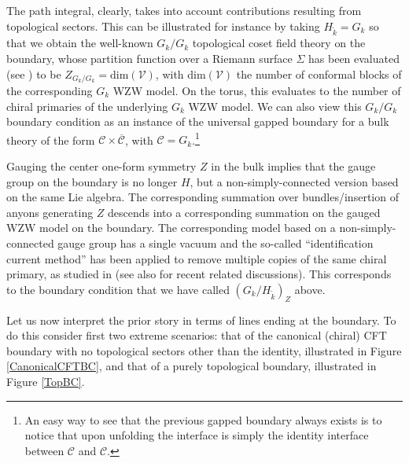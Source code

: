 \documentclass[11pt]{article}
\numberwithin{equation}{section}
\begin{document}
The path integral, clearly, takes into account contributions resulting from topological sectors. This can be illustrated for instance by taking $H_{\tilde{k}} = G_{k}$ so that we obtain the well-known $G_{k}/G_{k}$ topological coset field theory \cite{SPIEGELGLAS199221,Spiegelglas:1992jg,Witten:1991mm,Blau:1993tv} on the boundary, whose partition function over a Riemann surface $\Sigma$ has been evaluated (see \cite{Witten:1991mm}) to be $Z_{G_{k}/G_{k}} = \mathrm{dim}(\mathcal{V})$, with $\mathrm{dim}(\mathcal{V})$ the number of conformal blocks of the corresponding $G_{k}$ WZW model. On the torus, this evaluates to the number of chiral primaries of the underlying $G_{k}$ WZW model. We can also view this $G_{k}/G_{k}$ boundary condition as an instance of the universal gapped boundary for a bulk theory of the form $\mathcal{C} \times \overline{\mathcal{C}}$, with $\mathcal{C} = G_{k}$.\footnote{An easy way to see that the previous gapped boundary always exists is to notice that upon unfolding the interface is simply the identity interface between $\mathcal{C}$ and $\mathcal{C}$.}





Gauging the center one-form symmetry $Z$ in the bulk implies that the gauge group on the boundary is no longer $H$, but a non-simply-connected version based on the same Lie algebra. The corresponding summation over bundles/insertion of anyons generating $Z$ descends into a corresponding summation on the gauged WZW model on the boundary. The corresponding model based on a non-simply-connected gauge group has a single vacuum and the so-called ``identification current method'' has been applied to remove multiple copies of the same chiral primary, as studied in \cite{hori1994global} (see also \cite{Sharpe:2021srf} for recent related discussions). This corresponds to the boundary condition that we have called  $(G_{k}/H_{\tilde{k}})_{Z}$ above.

Let us now interpret the prior story in terms of lines ending at the boundary. To do this consider first two extreme scenarios: that of the canonical (chiral) CFT boundary with no topological sectors other than the identity, illustrated in Figure \ref{CanonicalCFTBC}, and that of a purely topological boundary, illustrated in Figure \ref{TopBC}. 
\end{document}
